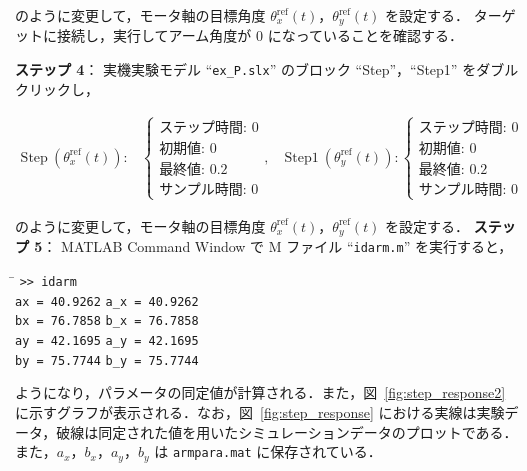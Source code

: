 のように変更して，モータ軸の目標角度 $\theta_x^{\mathrm{ref}}(t)$，$\theta_y^{\mathrm{ref}}(t)$ を設定する．
ターゲットに接続し，実行してアーム角度が $0$ になっていることを確認する．

\vspace{1em}
\noindent
\textbf{ステップ 4}：
実機実験モデル ``\texttt{ex\_P.slx}'' のブロック ``Step''，``Step1'' をダブルクリックし，

\[
\begin{array}{ll}
\text{Step}~(\theta_x^{\mathrm{ref}}(t))\!: &
\left\{
\begin{array}{l}
\text{ステップ時間: } 0 \\
\text{初期値: } 0 \\
\text{最終値: } 0.2 \\
\text{サンプル時間: } 0
\end{array}
\right., \quad
\text{Step1}~(\theta_y^{\mathrm{ref}}(t))\!: 
\left\{
\begin{array}{l}
\text{ステップ時間: } 0 \\
\text{初期値: } 0 \\
\text{最終値: } 0.2 \\
\text{サンプル時間: } 0
\end{array}
\right.
\end{array}
\]

のように変更して，モータ軸の目標角度 $\theta_x^{\mathrm{ref}}(t)$，$\theta_y^{\mathrm{ref}}(t)$ を設定する．
\vspace{1em}
\noindent
\textbf{ステップ 5}： MATLAB Command Window で M ファイル ``\texttt{idarm.m}'' を実行すると，

\begin{tabbing}
\hspace{1cm}\=\kill
\> \texttt{>> idarm} \\
\> \texttt{ax = 40.9262} \hspace{6cm} \texttt{a\_x = 40.9262} \\
\> \texttt{bx = 76.7858} \hspace{6cm} \texttt{b\_x = 76.7858} \\
\> \texttt{ay = 42.1695} \hspace{6cm} \texttt{a\_y = 42.1695} \\
\> \texttt{by = 75.7744} \hspace{6cm} \texttt{b\_y = 75.7744}
\end{tabbing}

\vspace{1em}
\noindent
ようになり，パラメータの同定値が計算される．また，図~\ref{fig:step_response2} に示すグラフが表示される．なお，図~\ref{fig:step_response} における実線は実験データ，破線は同定された値を用いたシミュレーションデータのプロットである．また，$a_x$，$b_x$，$a_y$，$b_y$ は \texttt{armpara.mat} に保存されている．


